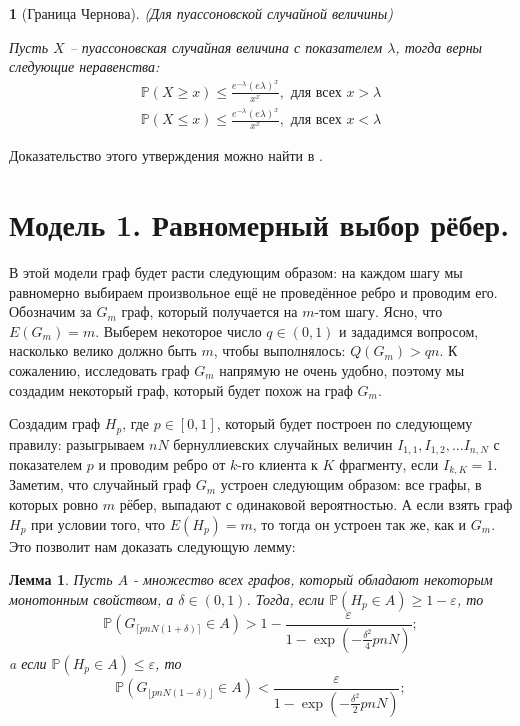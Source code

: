 \documentclass[10pt]{article}
\newcommand{\PRob}{\mathbb P}
\newcommand{\leqs}{\leqslant}
\newcommand{\geqs}{\geqslant}
\newcommand{\eps}{\varepsilon}
\newtheorem{lemma}{Лемма}
\theoremstyle{named}
\newtheorem*{namedpropo}{}
\begin{document}
\begin{namedpropo}[Граница Чернова] (Для пуассоновской случайной величины)

Пусть $X$ -- пуассоновская случайная величина с показателем $\lambda$, тогда верны следующие неравенства:
\begin{align} \label{gr_1}
\PRob(X \geqs x) \leqs \frac{e^{-\lambda}(e\lambda)^x}{x^x}, \text{ для всех } x > \lambda 
\\
\label{gr_2}
\PRob(X \leqs x) \leqs \frac{e^{-\lambda}(e\lambda)^x}{x^x}, \text{ для всех } x < \lambda 
\end{align}
\end{namedpropo}
Доказательство этого утверждения можно найти в \cite{chernov_gr}.

\section{Модель 1. Равномерный выбор рёбер.}
В этой модели граф будет расти следующим образом: на каждом шагу мы равномерно выбираем произвольное ещё не проведённое ребро 
и проводим его. Обозначим за $G_m$ граф, который получается на $m$-том шагу. Ясно, что $E(G_m) = m$.
Выберем некоторое число $q \in (0, 1)$ и зададимся вопросом, насколько велико должно быть $m$, чтобы выполнялось: $Q(G_m) > qn$.
К сожалению, исследовать граф $G_m$ напрямую не очень удобно, поэтому мы создадим некоторый граф, который будет похож на граф $G_m$.

Создадим граф $H_p$, где $p \in [0, 1]$, который будет построен по следующему правилу: 
разыгрываем $nN$ бернуллиевских случайных величин $I_{1,1}, I_{1,2}, \dots I_{n,N}$ с показателем $p$ и проводим ребро от $k$-го клиента к $K$ фрагменту, 
если $I_{k, K} = 1$.
Заметим, что случайный граф $G_m$ устроен следующим образом: все графы, в которых ровно $m$ рёбер, выпадают с одинаковой вероятностью.
А если взять граф $H_p$ при условии того, что $E(H_p) = m$, то тогда он устроен так же, как и $G_m$.
Это позволит нам доказать следующую лемму:

\begin{lemma} \label{l1}
Пусть $A$ - множество всех графов, который обладают некоторым монотонным свойством, а $\delta \in (0,1)$.
Тогда, если $\PRob( H_p \in A) \geqs 1 - \eps$, то
\begin{equation} \label{l1_1}
\PRob(G_{\lceil pnN(1+\delta) \rceil} \in A) > 1 - \frac{\eps}{1 - \exp\left(-\frac{\delta^2}{4}pnN\right)};
\end{equation}
a если $\PRob( H_p \in A) \leqs \eps$, то
\begin{equation}\label{l1_2}
\PRob(G_{\lfloor pnN(1-\delta) \rfloor} \in A) < \frac{\eps}{1 - \exp\left(-\frac{\delta^2}{2}pnN\right)};
\end{equation}
\end{lemma}
\end{document}
